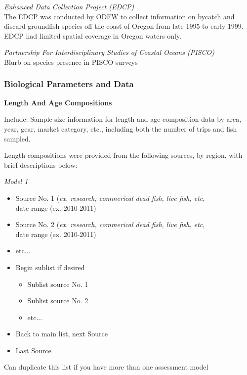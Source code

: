 \documentclass[12pt,]{article}
\begin{document}
\emph{Enhanced Data Collection Project (EDCP)}\\
The EDCP was conducted by ODFW to collect information on bycatch and
discard groundfish species off the coast of Oregon from late 1995 to
early 1999.\\
EDCP had limited spatial coverage in Oregon waters only.

\emph{Partnership For Interdisciplinary Studies of Coastal Oceans
(PISCO)}\\
Blurb on species presence in PISCO surveys

\subsubsection{Biological Parameters and
Data}\label{biological-parameters-and-data}

\textbf{Length And Age Compositions}

Include: Sample size information for length and age composition data by
area, year, gear, market category, etc., including both the number of
trips and fish sampled.

Length compositions were provided from the following sources, by region,
with brief descriptions below:

\emph{Model 1}

\begin{itemize}[noitemsep,nolistsep,topsep=0pt]
  \item Source No. 1 (\emph{ex. research, commerical dead fish, live fish, etc},\\     
        date range (ex. 2010-2011)
  \item Source No. 2 (\emph{ex. research, commerical dead fish, live fish, etc},\\      
        date range (ex. 2010-2011) 
  \item etc...      
  \item Begin sublist if desired 
    \begin{itemize}[noitemsep,nolistsep]
      \item Sublist source No. 1     
      \item Sublist source No. 2        
      \item etc...     
    \end{itemize}
  \item Back to main list, next Source     
  \item Last Source     
\end{itemize}

Can duplicate this list if you have more than one assessment model
\end{document}

